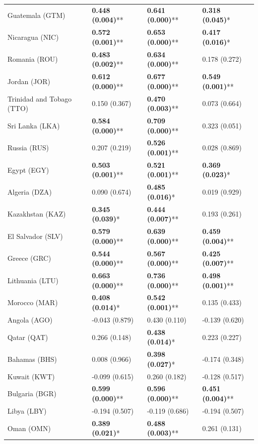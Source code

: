 \begin{longtable}{p{4cm}p{3cm}p{3cm}p{3cm}}
Guatemala (GTM) & \textbf{0.448 (0.004)}** & \textbf{0.641 (0.000)}** & \textbf{0.318 (0.045)}* \\
Nicaragua (NIC) & \textbf{0.572 (0.001)}** & \textbf{0.653 (0.000)}** & \textbf{0.417 (0.016)}* \\
Romania (ROU) & \textbf{0.483 (0.002)}** & \textbf{0.634 (0.000)}** & 0.178 (0.272) \\
Jordan (JOR) & \textbf{0.612 (0.000)}** & \textbf{0.677 (0.000)}** & \textbf{0.549 (0.001)}** \\
Trinidad and Tobago (TTO) & 0.150 (0.367) & \textbf{0.470 (0.003)}** & 0.073 (0.664) \\
Sri Lanka (LKA) & \textbf{0.584 (0.000)}** & \textbf{0.709 (0.000)}** & 0.323 (0.051) \\
Russia (RUS) & 0.207 (0.219) & \textbf{0.526 (0.001)}** & 0.028 (0.869) \\
Egypt (EGY) & \textbf{0.503 (0.001)}** & \textbf{0.521 (0.001)}** & \textbf{0.369 (0.023)}* \\
Algeria (DZA) & 0.090 (0.674) & \textbf{0.485 (0.016)}* & 0.019 (0.929) \\
Kazakhstan (KAZ) & \textbf{0.345 (0.039)}* & \textbf{0.444 (0.007)}** & 0.193 (0.261) \\
El Salvador (SLV) & \textbf{0.579 (0.000)}** & \textbf{0.639 (0.000)}** & \textbf{0.459 (0.004)}** \\
Greece (GRC) & \textbf{0.544 (0.000)}** & \textbf{0.567 (0.000)}** & \textbf{0.425 (0.007)}** \\
Lithuania (LTU) & \textbf{0.663 (0.000)}** & \textbf{0.736 (0.000)}** & \textbf{0.498 (0.001)}** \\
Morocco (MAR) & \textbf{0.408 (0.014)}* & \textbf{0.542 (0.001)}** & 0.135 (0.433) \\
Angola (AGO) & -0.043 (0.879) & 0.430 (0.110) & -0.139 (0.620) \\
Qatar (QAT) & 0.266 (0.148) & \textbf{0.438 (0.014)}* & 0.223 (0.227) \\
Bahamas (BHS) & 0.008 (0.966) & \textbf{0.398 (0.027)}* & -0.174 (0.348) \\
Kuwait (KWT) & -0.099 (0.615) & 0.260 (0.182) & -0.128 (0.517) \\
Bulgaria (BGR) & \textbf{0.599 (0.000)}** & \textbf{0.596 (0.000)}** & \textbf{0.451 (0.004)}** \\
Libya (LBY) & -0.194 (0.507) & -0.119 (0.686) & -0.194 (0.507) \\
Oman (OMN) & \textbf{0.389 (0.021)}* & \textbf{0.488 (0.003)}** & 0.261 (0.131) \\

\end{longtable}
